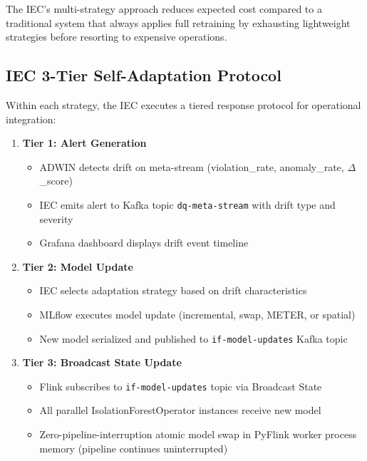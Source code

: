 The IEC's multi-strategy approach reduces expected cost compared to a traditional system that always applies full retraining by exhausting lightweight strategies before resorting to expensive operations.

\subsection{IEC 3-Tier Self-Adaptation Protocol}

Within each strategy, the IEC executes a tiered response protocol for operational integration:

\begin{enumerate}
    \item \textbf{Tier 1: Alert Generation}
        \begin{itemize}
            \item ADWIN detects drift on meta-stream (violation\_rate, anomaly\_rate, $\Delta$\_score)
            \item IEC emits alert to Kafka topic \texttt{dq-meta-stream} with drift type and severity
            \item Grafana dashboard displays drift event timeline
        \end{itemize}

    \item \textbf{Tier 2: Model Update}
        \begin{itemize}
            \item IEC selects adaptation strategy based on drift characteristics
            \item MLflow executes model update (incremental, swap, METER, or spatial)
            \item New model serialized and published to \texttt{if-model-updates} Kafka topic
        \end{itemize}

    \item \textbf{Tier 3: Broadcast State Update}
        \begin{itemize}
            \item Flink subscribes to \texttt{if-model-updates} topic via Broadcast State
            \item All parallel IsolationForestOperator instances receive new model
            \item Zero-pipeline-interruption atomic model swap in PyFlink worker process memory (pipeline continues uninterrupted)
        \end{itemize}
\end{enumerate}

